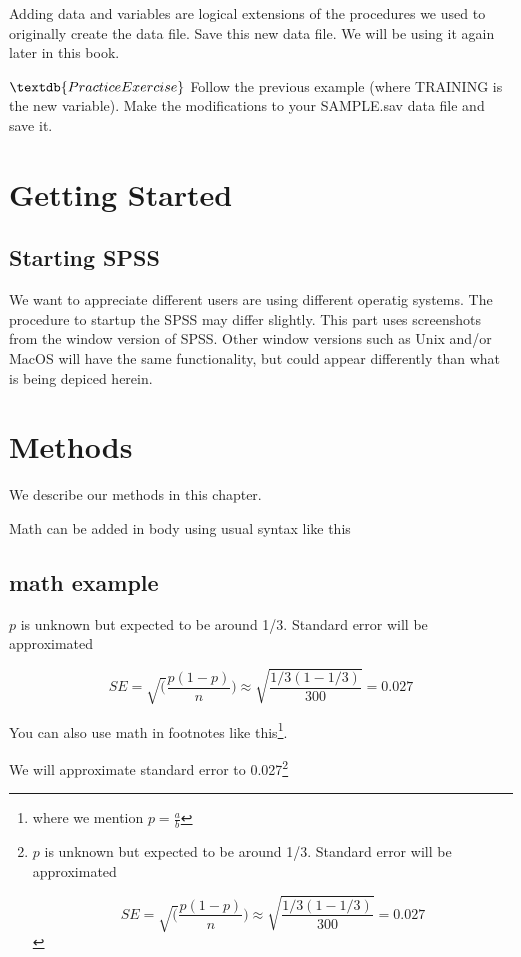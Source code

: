 \documentclass[
]{book}
\begin{document}
Adding data and variables are logical extensions of the procedures we used to originally create the data file. Save this new data file. We will be using it again later in this book.

\(\textdb{Practice Exercise}\)
Follow the previous example (where TRAINING is the new variable). Make the modifications to your SAMPLE.sav data file and save it.

\hypertarget{getting-started-1}{%
\chapter{Getting Started}\label{getting-started-1}}

\hypertarget{starting-spss-1}{%
\section{Starting SPSS}\label{starting-spss-1}}

We want to appreciate different users are using different operatig systems. The procedure to startup the SPSS may differ slightly.
This part uses screenshots from the window version of SPSS. Other window versions such as Unix and/or MacOS will have the same functionality, but could appear differently than what is being depiced herein.

\hypertarget{methods}{%
\chapter{Methods}\label{methods}}

We describe our methods in this chapter.

Math can be added in body using usual syntax like this

\hypertarget{math-example}{%
\section{math example}\label{math-example}}

\(p\) is unknown but expected to be around 1/3. Standard error will be approximated

\[
SE = \sqrt(\frac{p(1-p)}{n}) \approx \sqrt{\frac{1/3 (1 - 1/3)} {300}} = 0.027
\]

You can also use math in footnotes like this\footnote{where we mention \(p = \frac{a}{b}\)}.

We will approximate standard error to 0.027\footnote{\(p\) is unknown but expected to be around 1/3. Standard error will be approximated

  \[
  SE = \sqrt(\frac{p(1-p)}{n}) \approx \sqrt{\frac{1/3 (1 - 1/3)} {300}} = 0.027
  \]}
\end{document}
